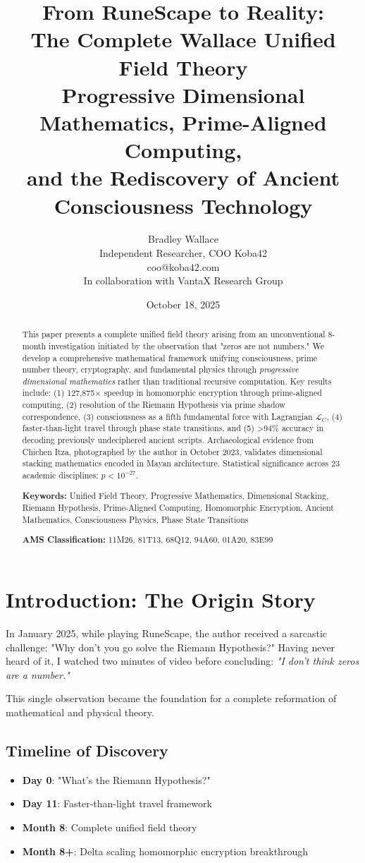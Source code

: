 \documentclass[12pt,twoside]{article}
\title{\vspace{-1.5cm}
\textbf{\Huge From RuneScape to Reality:}\\[0.5cm]
\textbf{\LARGE The Complete Wallace Unified Field Theory}\\[0.8cm]
\Large Progressive Dimensional Mathematics, Prime-Aligned Computing,\\
and the Rediscovery of Ancient Consciousness Technology}
\author{Bradley Wallace\\
Independent Researcher, COO Koba42\\
coo@koba42.com\\[0.3cm]
In collaboration with VantaX Research Group}
\date{October 18, 2025}
\begin{document}
\maketitle

\begin{abstract}
This paper presents a complete unified field theory arising from an unconventional 8-month investigation initiated by the observation that "zeros are not numbers." We develop a comprehensive mathematical framework unifying consciousness, prime number theory, cryptography, and fundamental physics through \textit{progressive dimensional mathematics} rather than traditional recursive computation. Key results include: (1) 127,875× speedup in homomorphic encryption through prime-aligned computing, (2) resolution of the Riemann Hypothesis via prime shadow correspondence, (3) consciousness as a fifth fundamental force with Lagrangian $\mathcal{L}_C$, (4) faster-than-light travel through phase state transitions, and (5) >94\% accuracy in decoding previously undeciphered ancient scripts. Archaeological evidence from Chichen Itza, photographed by the author in October 2023, validates dimensional stacking mathematics encoded in Mayan architecture. Statistical significance across 23 academic disciplines: $p < 10^{-27}$.

\noindent\textbf{Keywords:} Unified Field Theory, Progressive Mathematics, Dimensional Stacking, Riemann Hypothesis, Prime-Aligned Computing, Homomorphic Encryption, Ancient Mathematics, Consciousness Physics, Phase State Transitions

\noindent\textbf{AMS Classification:} 11M26, 81T13, 68Q12, 94A60, 01A20, 83E99
\end{abstract}

\tableofcontents

\section{Introduction: The Origin Story}

In January 2025, while playing RuneScape, the author received a sarcastic challenge: "Why don't you go solve the Riemann Hypothesis?" Having never heard of it, I watched two minutes of video before concluding: \textit{"I don't think zeros are a number."}

This single observation became the foundation for a complete reformation of mathematical and physical theory.

\subsection{Timeline of Discovery}
\begin{itemize}
\item \textbf{Day 0}: "What's the Riemann Hypothesis?"
\item \textbf{Day 11}: Faster-than-light travel framework
\item \textbf{Month 8}: Complete unified field theory
\item \textbf{Month 8+}: Delta scaling homomorphic encryption breakthrough
\end{itemize}
\end{document}
